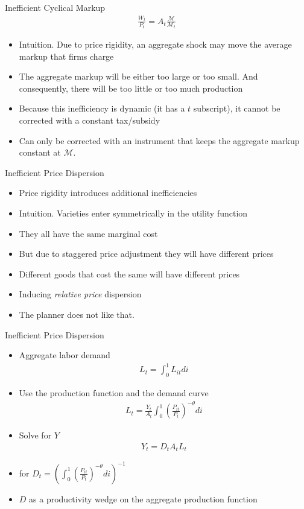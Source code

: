 \documentclass[11pt,aspectratio=169,xcolor={dvipsnames},hyperref={pdftex,pdfpagemode=UseNone,hidelinks,pdfdisplaydoctitle=true},usepdftitle=false]{beamer}
\begin{document}
\begin{frame}{Inefficient Cyclical Markup}
\begin{align*}
\frac{W_t}{P_t} = A_t \frac{\mathcal{M}}{\mathcal{M}_t}
\end{align*}
\begin{itemize}
\item Intuition. Due to price rigidity, an aggregate shock may move the average markup that firms charge
\item The aggregate markup will be either too large or too small. And consequently, there will be too little or too much production
\item Because this inefficiency is dynamic (it has a $t$ subscript), it cannot be corrected with a constant tax/subsidy
\item Can only be corrected with an instrument that keeps the aggregate markup constant at $\mathcal{M}$.
\end{itemize}
\end{frame}

\begin{frame}{Inefficient Price Dispersion}
\begin{itemize}
\item Price rigidity introduces additional inefficiencies
\item Intuition. Varieties enter symmetrically in the utility function
\item They all have the same marginal cost
\item But due to staggered price adjustment they will have different prices
\item Different goods that cost the same will have different prices
\item Inducing \textit{relative price} dispersion
\item The planner does not like that.
\end{itemize}
\end{frame}


\begin{frame}{Inefficient Price Dispersion}
\begin{itemize}
\item Aggregate labor demand
\begin{align}
L_t = \int_0^1 L_{it} di
\end{align}
\item Use the production function and the demand curve
\begin{align}
L_t = \frac{Y_t}{A_t} \int_0^1 \left(\frac{P_{it}}{P_t}\right)^{-\theta} di
\end{align}
\item Solve for $Y$
\begin{align*}
Y_t = D_t A_t L_t
\end{align*}
\item for $D_t = \left( \int_0^1 \left(\frac{P_{it}}{P_t}\right)^{-\theta} di\right)^{-1}$
\item $D$ as a productivity wedge on the aggregate production function
\end{itemize}
\end{frame}
\end{document}

